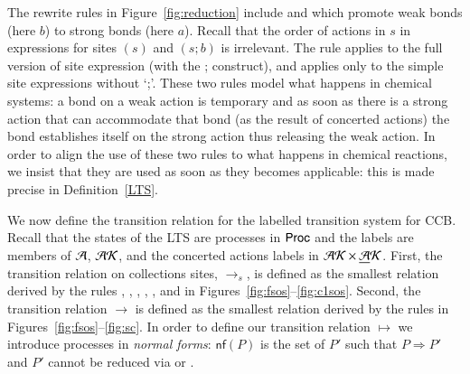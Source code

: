 {The rewrite rules in Figure~\ref{fig:reduction} include 
 and 
which promote weak bonds (here $b$) to strong bonds (here $a$). Recall that the order of actions in $s$ in expressions for sites
$(s)$ and $(s;b)$ is irrelevant.
The rule  applies to the full version of site expression (with the ; construct), and
 applies only to the simple site expressions without `;'.
These two rules model what happens in chemical systems: a bond on a weak action is 
temporary and as soon as there is a strong action that can accommodate that bond (as the result
of concerted actions) the bond establishes itself on the strong action thus releasing the weak action.
In order to align the use of these two rules to what happens in chemical reactions, we insist
that they are used as soon as they becomes applicable: this is made 
precise in Definition~\ref{LTS}.

We now define the transition relation for the labelled transition system for CCB.
Recall that the states of the LTS are processes in $\mathsf{Proc}$ and the labels are members of $\mathcal{A}$,
$\mathcal{AK}$, and the concerted actions labels in $\mathcal{AK} \times \underline{\mathcal{A}}\mathcal{K}$.
First, the transition relation on collections sites, $\rightarrow_s$, 
is defined as the smallest relation derived by the rules , ,  , ,   
, and  in Figures~\ref{fig:fsos}--\ref{fig:c1sos}.  Second, the transition relation $\rightarrow$ is defined
as the smallest relation derived by the rules in Figures~\ref{fig:fsos}--\ref{fig:sc}. 
%
In order to define our transition relation $\mapsto$ we introduce processes in \emph{normal forms}: $\mathsf{nf}(P)$ is the set of $P'$ 
such that $P\Rightarrow P'$ and $P'$ cannot be reduced via  or  .



}
